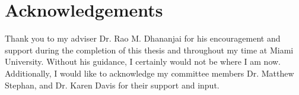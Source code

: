 \clearpage
\section*{\centering Acknowledgements}
\begin{flushleft}
Thank you to my adviser Dr. Rao M. Dhananjai for his encouragement and support during the completion of this thesis and throughout my time at Miami University.  Without his guidance, I certainly would not be where I am now.  Additionally, I would like to acknowledge my committee members Dr. Matthew Stephan, and Dr. Karen Davis for their support and input. 

~\newline

\end{flushleft}
